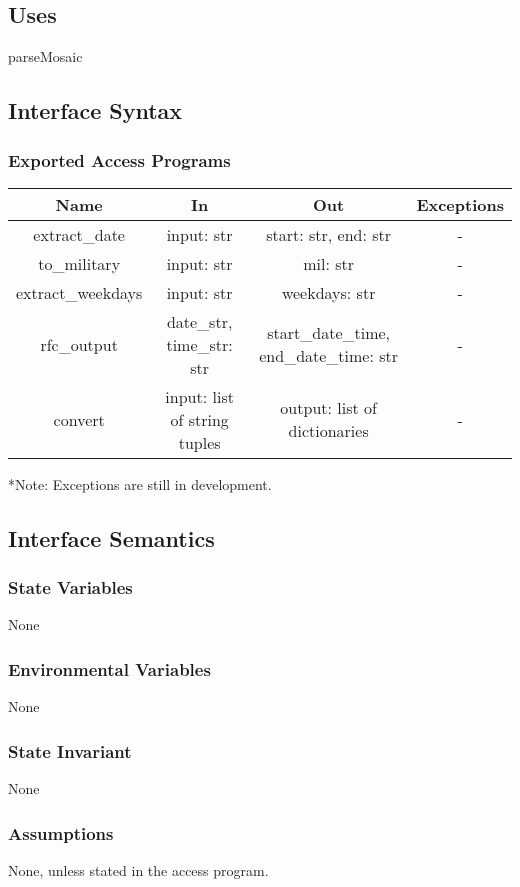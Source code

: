 \documentclass[12pt, titlepage]{article}
\begin{document}
\subsection{Uses}
parseMosaic

\subsection{Interface Syntax}
\subsubsection{Exported Access Programs}
\begin{tabular}[pos]{|c|c|c|c|}
	\hline
	\textbf{Name}& \textbf{In} &  \textbf{Out} & \textbf{Exceptions} \\ \hline
	extract\_date & input: str & start: str, end: str & -\\
	\hline
	to\_military & input: str & mil: str & -\\
	\hline
	extract\_weekdays & input: str & weekdays: str & - \\
	\hline 
	rfc\_output & date\_str, time\_str: str & start\_date\_time, end\_date\_time: str & - \\
	\hline 
	convert & input: list of string tuples & output: list of dictionaries & - \\
	\hline 
\end{tabular}
*Note: Exceptions are still in development.
\subsection{Interface Semantics}
\subsubsection{State Variables}
None
\subsubsection{Environmental Variables}
None
\subsubsection{State Invariant}
None
\subsubsection{Assumptions}
None, unless stated in the access program.
\end{document}
